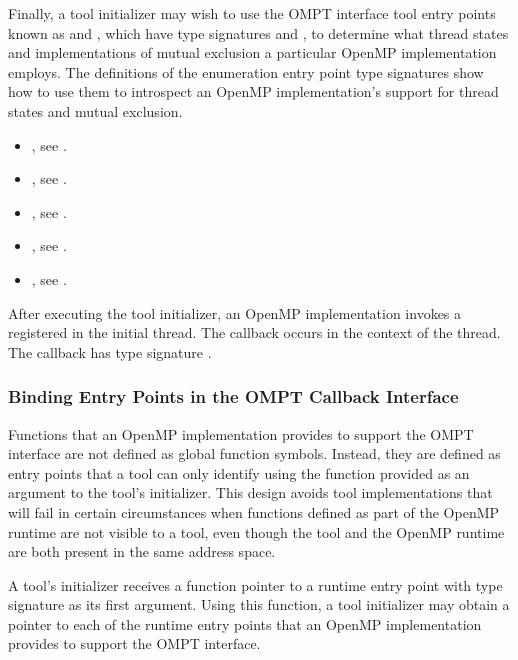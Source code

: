 Finally, a tool initializer may wish to use the OMPT interface tool
entry points known as  and
, which have type signatures
 and
, to determine what thread
states and implementations of mutual exclusion a particular OpenMP
implementation employs. The definitions of the enumeration entry point
type signatures show how to use them to introspect an OpenMP
implementation's support for thread states and mutual exclusion.

\crossreferences
\begin{itemize}
\item {}, see .
\item {}, see .
\item {}, see .
\item {}, see .
\item {}, see
  .
\end{itemize}

After executing the tool initializer, an OpenMP implementation invokes
a registered  in the initial
thread. The callback occurs in the context of the thread.  The
callback has type signature .

\subsubsection{Binding Entry Points in the OMPT Callback Interface}
\label{sec:ompt-bind}

Functions that an OpenMP implementation provides to support the OMPT interface
are not defined as global function symbols. Instead, they are defined as entry points 
that a tool can only identify using the  function provided as an
argument to the tool's initializer. This design avoids tool
implementations that
will fail in certain circumstances when functions defined as part of
the OpenMP runtime are not visible to a tool, even though the tool and
the OpenMP runtime are both present in the same address space.
 
A tool's initializer receives a function pointer to a
 runtime entry point with type signature
  as its first argument. Using this
function, a tool initializer may obtain a pointer to
each of the runtime entry points that an OpenMP implementation provides to support
the OMPT interface.

